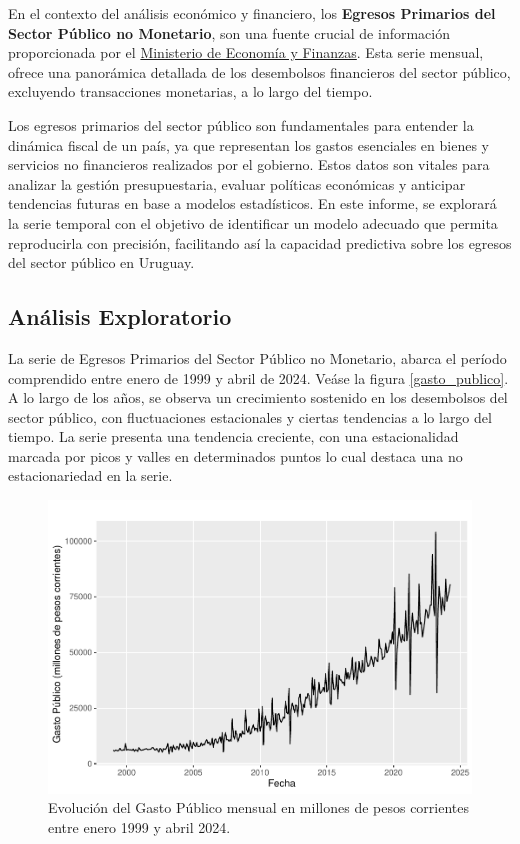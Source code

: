 \documentclass[
  12pt,
]{article}
\begin{document}
En el contexto del análisis económico y financiero, los \textbf{Egresos
Primarios del Sector Público no Monetario}, son una fuente crucial de
información proporcionada por el
\href{https://www.gub.uy/ministerio-economia-finanzas/datos-y-estadisticas/estadisticas/informacion-resultados-del-sector-publico}{Ministerio
de Economía y Finanzas}. Esta serie mensual, ofrece una panorámica
detallada de los desembolsos financieros del sector público, excluyendo
transacciones monetarias, a lo largo del tiempo.

Los egresos primarios del sector público son fundamentales para entender
la dinámica fiscal de un país, ya que representan los gastos esenciales
en bienes y servicios no financieros realizados por el gobierno. Estos
datos son vitales para analizar la gestión presupuestaria, evaluar
políticas económicas y anticipar tendencias futuras en base a modelos
estadísticos. En este informe, se explorará la serie temporal con el
objetivo de identificar un modelo adecuado que permita reproducirla con
precisión, facilitando así la capacidad predictiva sobre los egresos del
sector público en Uruguay.

\hypertarget{anuxe1lisis-exploratorio}{%
\subsection{Análisis Exploratorio}\label{anuxe1lisis-exploratorio}}

La serie de Egresos Primarios del Sector Público no Monetario, abarca el
período comprendido entre enero de 1999 y abril de 2024. Veáse la figura
\ref{gasto_publico}. A lo largo de los años, se observa un crecimiento
sostenido en los desembolsos del sector público, con fluctuaciones
estacionales y ciertas tendencias a lo largo del tiempo. La serie
presenta una tendencia creciente, con una estacionalidad marcada por
picos y valles en determinados puntos lo cual destaca una no
estacionariedad en la serie.

\begin{figure}[H]

{\centering \includegraphics[width=0.75\linewidth]{informe_files/figure-latex/plot_series_inicial-1} 

}

\caption{\label{gasto_publico} Evolución del Gasto Público mensual en millones de pesos corrientes entre enero 1999 y abril 2024.}\label{fig:plot_series_inicial}
\end{figure}
\end{document}
